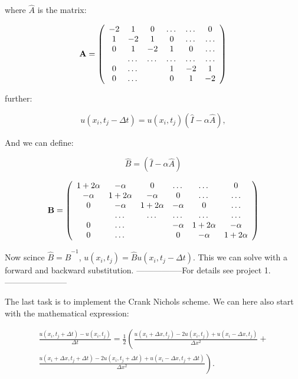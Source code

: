 \documentclass[english,a4paper,12pt]{article}
\begin{document}
where $\hat A$ is the matrix:

\begin{equation}
{\bf A} = \left(\begin{array}{cccccc}
-2& 1& 0 &\dots & \dots &0 \\
1 & -2 & 1 &0 &\dots &\dots \\
0&1 &-2 & 1 & 0 & \dots \\
& \dots & \dots &\dots &\dots & \dots \\
0&\dots & &1 &-2& 1 \\
0&\dots & & 0 &1 & -2 \\
\end{array} \right)
\end{equation}

further:

\begin{equation}
u(x_i,t_j-\Delta t) = u(x_i,t_j)(\hat I -\alpha \hat A),
\end{equation}

And we can define:

\begin{equation}
\hat B = (\hat I -\alpha \hat A)
\end{equation}

\begin{equation}
{\bf B} = \left(\begin{array}{cccccc}
1+2\alpha& -\alpha& 0 &\dots & \dots &0 \\
-\alpha & 1+2\alpha & -\alpha &0 &\dots &\dots \\
0&-\alpha &1+2\alpha & -\alpha & 0 & \dots \\
& \dots & \dots &\dots &\dots & \dots \\
0&\dots & &-\alpha &1+2\alpha& -\alpha \\
0&\dots & & 0 &-\alpha & 1+2\alpha \\
\end{array} \right)
\end{equation}

Now scince $\hat B = \hat B^{-1}$, $ u(x_i,t_j) = \hat B u(x_i,t_j-\Delta t)$. This we can solve with a forward and backward substitution.
-----------------For details see project 1.-----------------------

The last task is to implement the Crank Nichols scheme. We can here also start with the mathematical expression:

\begin{equation}
\begin{split}
\frac{u(x_i,t_j+\Delta t)-u(x_i,t_j)}{\Delta t} = \frac{1}{2}\left(\frac{u(x_i+\Delta x,t_j)-2u(x_i,t_j)+u(x_i-\Delta x,t_j)}{\Delta x^2}+\right. \\
\left. \frac{u(x_i+\Delta x,t_j+\Delta t)-2u(x_i,t_j+\Delta t)+u(x_i-\Delta x,t_j+\Delta t)}{\Delta x^2} \right).
\end{split}
\end{equation}
\end{document}

